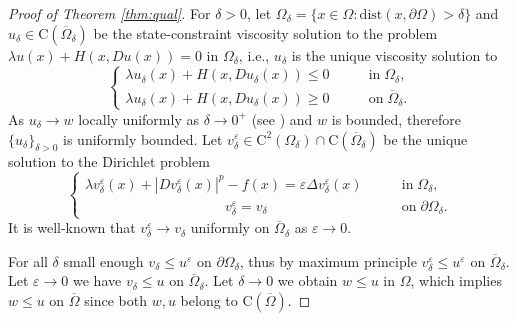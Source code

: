 \documentclass[11pt,reqno]{amsart}
\numberwithin{figure}{section}
\theoremstyle{plain}
\theoremstyle{remark}
\numberwithin{equation}{section}
\newcommand{\rmC}{\mathrm{C}}
\begin{document}
\begin{proof}[Proof of Theorem \ref{thm:qual}]
For $\delta>0$, let $\Omega_\delta = \{x\in \Omega: \mathrm{dist}(x,\partial \Omega) > \delta\}$ and $u_\delta\in\rmC(\overline{\Omega}_\delta)$ be the state-constraint viscosity solution to the problem $\lambda u(x) + H(x,Du(x)) = 0$ in $\Omega_\delta$, i.e., $u_\delta$ is the unique viscosity solution to
\begin{equation}\label{e:v_v}
    \begin{cases}
    \lambda u_\delta(x) + H(x,Du_\delta(x)) \leq 0 &\qquad\text{in}\;\Omega_\delta,\\
    \lambda u_\delta(x) + H(x,Du_\delta(x)) \geq 0 &\qquad\text{on}\;\overline{\Omega}_\delta.
    \end{cases}
\end{equation}
As $u_\delta\rightarrow w$ locally uniformly as $\delta\rightarrow 0^+$ (see \cite{kim_state-constraint_2020}) and $w$ is bounded, therefore $\{u_\delta\}_{\delta>0}$ is uniformly bounded. Let $v^\varepsilon_\delta\in \rmC^2(\Omega_\delta)\cap \rmC(\overline{\Omega}_\delta)$ be the unique solution to the Dirichlet problem
\begin{equation}\label{eq:vv_eps}
\begin{cases}
    \lambda v_\delta^\varepsilon(x) + |Dv_\delta^\varepsilon(x)|^p - f(x) = \varepsilon \Delta v_\delta^\varepsilon(x) &\qquad\text{in}\;\Omega_\delta,\\
    \;\;\;\,\quad\qquad\qquad\qquad\qquad v_\delta^\varepsilon = v_\delta &\qquad \text{on}\;\partial\Omega_\delta.
\end{cases}
\end{equation}
It is well-known that $v^\varepsilon_\delta\to v_\delta$ uniformly on $\overline{\Omega}_\delta$ as $\varepsilon\to 0$.

For all $\delta$ small enough $v_\delta\leq u^\varepsilon$ on $\partial \Omega_\delta$, thus by maximum principle $v^\varepsilon_\delta \leq u^\varepsilon$ on $\overline{\Omega}_\delta$. Let $\varepsilon\to 0$ we have $v_\delta \leq u$ on $\overline{\Omega}_\delta$.
Let $\delta\rightarrow 0$ we obtain $w\leq u$ in $\Omega$, which implies $w\leq u$ on $\overline{\Omega}$ since both $w,u$ belong to $\rmC(\overline{\Omega})$.
\end{proof}
\end{document}
